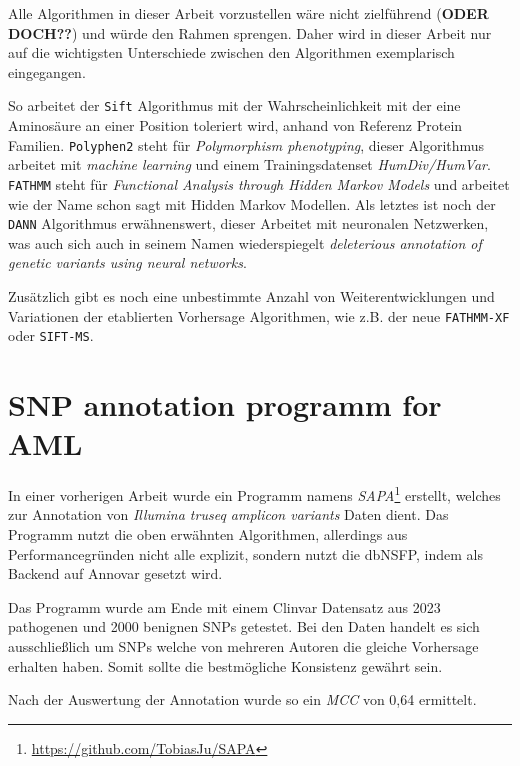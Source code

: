 Alle Algorithmen in dieser Arbeit vorzustellen wäre nicht zielführend (\textbf{ODER DOCH??}) und würde den Rahmen sprengen. Daher wird in dieser Arbeit nur auf die wichtigsten Unterschiede zwischen den Algorithmen exemplarisch eingegangen. 

So arbeitet der \texttt{Sift}\cite{Vaser.2016} Algorithmus mit der Wahrscheinlichkeit mit der eine Aminosäure an einer Position toleriert wird, anhand von Referenz Protein Familien.
\texttt{Polyphen2}\cite{Adzhubei.2013} steht für \emph{Polymorphism phenotyping}, dieser Algorithmus arbeitet mit \emph{machine learning} und einem Trainingsdatenset \emph{HumDiv/HumVar}.
\texttt{FATHMM}\cite{Shihab.2013} steht für \emph{Functional Analysis through Hidden Markov Models} und arbeitet wie der Name schon sagt mit Hidden Markov Modellen.
Als letztes ist noch der \texttt{DANN} \cite{Quang.2015} Algorithmus erwähnenswert, dieser Arbeitet mit neuronalen Netzwerken, was auch sich auch in seinem Namen wiederspiegelt \emph{ deleterious annotation of genetic variants using neural networks}.

Zusätzlich gibt es noch eine unbestimmte Anzahl von Weiterentwicklungen und Variationen der etablierten Vorhersage Algorithmen, wie z.B. der neue \texttt{FATHMM-XF}\cite{Rogers.2017} oder \texttt{SIFT-MS}\cite{Smith.2015}.



\section{SNP annotation programm for AML}
\label{sec:sapa}
In einer vorherigen Arbeit wurde ein Programm namens \emph{SAPA}\footnote{\url{https://github.com/TobiasJu/SAPA}} erstellt, welches zur Annotation von \emph{Illumina truseq amplicon variants} Daten dient. Das Programm nutzt die oben erwähnten Algorithmen, allerdings aus Performancegründen nicht alle explizit, sondern nutzt die dbNSFP\cite{Liu.2016}, indem als Backend auf Annovar\cite{Wang.2010} gesetzt wird. 

Das Programm wurde am Ende mit einem Clinvar Datensatz aus 2023 pathogenen und 2000 benignen SNPs getestet. Bei den Daten handelt es sich ausschließlich um SNPs welche von mehreren Autoren die gleiche Vorhersage erhalten haben. Somit sollte die bestmögliche Konsistenz gewährt sein.

Nach der Auswertung der Annotation wurde so ein \emph{MCC} von 0,64 ermittelt.